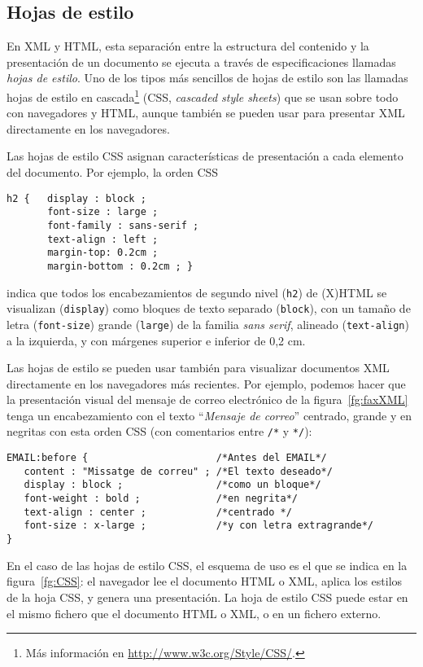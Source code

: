 {\subsection{Hojas de estilo} En XML y HTML, esta separación entre la estructura del contenido y la presentación de un documento se ejecuta a través de especificaciones llamadas \emph{hojas de estilo}. Uno de los tipos más sencillos de hojas de estilo son las llamadas hojas de estilo en cascada\footnote{Más información en \url{http://www.w3c.org/Style/CSS/}.} (CSS, \emph{cascaded style sheets}) que se usan sobre todo con navegadores y HTML, aunque también se pueden usar para presentar XML directamente en los navegadores. 

Las hojas de estilo CSS asignan características de presentación a cada
elemento del documento. Por ejemplo, la orden CSS 
\begin{verbatim}
h2 {   display : block ;
       font-size : large ;
       font-family : sans-serif ;
       text-align : left ;
       margin-top: 0.2cm ;
       margin-bottom : 0.2cm ; }
\end{verbatim}
indica que todos los encabezamientos de segundo nivel (\texttt{h2}) de (X)HTML se visualizan (\texttt{display}) como bloques de texto separado (\texttt{block}), con un tamaño de letra (\texttt{font-size}) grande (\texttt{large}) de la familia \emph{sans serif}, alineado (\texttt{text-align}) a la izquierda, y con márgenes superior e inferior de 0,2 cm. 

Las hojas de estilo se pueden usar también para visualizar documentos
XML directamente en los navegadores más recientes. Por ejemplo,
podemos hacer que la presentación visual del mensaje de correo
electrónico de la figura~\ref{fg:faxXML} tenga un encabezamiento con
el texto ``\emph{Mensaje de correo}'' centrado, grande y en negritas
con esta orden CSS (con comentarios entre \texttt{/*} y  \texttt{*/}): 
\begin{verbatim}
EMAIL:before {                      /*Antes del EMAIL*/
   content : "Missatge de correu" ; /*El texto deseado*/
   display : block ;                /*como un bloque*/
   font-weight : bold ;             /*en negrita*/
   text-align : center ;            /*centrado */
   font-size : x-large ;            /*y con letra extragrande*/
}
\end{verbatim}

En el caso de las hojas de estilo CSS, el esquema de uso es el que se indica en la figura~\ref{fg:CSS}: el navegador lee el documento HTML o XML,  aplica los estilos de la hoja CSS, y genera una presentación. La hoja de estilo CSS puede estar en el mismo fichero que el documento HTML o XML, o en un fichero externo. 

}

